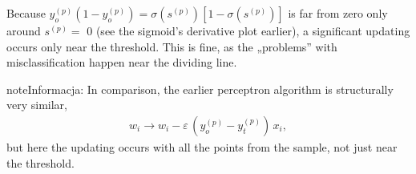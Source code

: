 \documentclass[a4paper,12pt,polish]{jupyterBook}
\begin{document}
\sphinxAtStartPar
Because \( y_o ^ {(p)} (1-y_o ^ {(p)}) = \sigma (s ^ {(p)}) [1- \sigma (s ^ {(p)})] \) is far from zero only around \( s ^ {(p)} = \) 0 (see the sigmoid’s derivative plot earlier), a significant updating occurs only near the threshold. This is fine, as the „problems” with misclassification happen near the dividing line.

\begin{sphinxadmonition}{note}{Informacja:}
\sphinxAtStartPar
In comparison, the earlier perceptron algorithm is structurally very similar,
\begin{equation*}
\begin{split}w_i \to w_i - \varepsilon \,(y_o^{(p)} - y_t^{(p)}) \, x_i,\end{split}
\end{equation*}
\sphinxAtStartPar
but here the updating occurs with all the points from the sample, not just near the threshold.
\end{sphinxadmonition}
\end{document}
